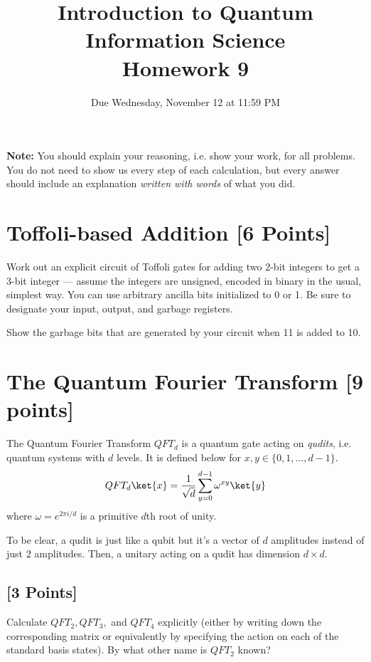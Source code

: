 \documentclass[11pt]{article}
\providecommand{\due}{Due Wednesday, November 12 at 11:59 PM}
\begin{document}
\title{Introduction to Quantum Information Science\\Homework 9}
\date{\due}

\maketitle

\textbf{Note:} You should explain your reasoning, i.e. show your work, for all problems. You do not need to show us every step of each calculation, but every answer should include an explanation \emph{written with words} of what you did.

\section{Toffoli-based Addition [6 Points]}
Work out an explicit circuit of Toffoli gates for adding two 2-bit integers to get a 3-bit integer --- assume the integers are unsigned, encoded in binary in the usual, simplest way. You can use arbitrary ancilla bits initialized to 0 or 1. Be sure to designate your input, output, and garbage registers. 

\noindent Show the garbage bits that are generated by your circuit when 11 is added to 10.



\section{The Quantum Fourier Transform [9 points]}
The Quantum Fourier Transform $QFT_d$ is a quantum gate acting on \textit{qudits}, i.e. quantum systems with $d$ levels. It is defined below for $x,y \in \{0,1,..., d-1\}$.
$$QFT_d\ket{x} = \frac{1}{\sqrt{d}} \sum^{d-1}_{y=0} \omega^{xy} \ket{y} $$
where $\omega = e^{2 \pi i /d}$ is a primitive $d$th root of unity.

To be clear, a qudit is just like a qubit but it's a vector of $d$ amplitudes instead of just $2$ amplitudes. Then, a unitary acting on a qudit has dimension $d\times d$.

\subsection{[3 Points]}
Calculate $QFT_2, QFT_3,$ and $QFT_4$ explicitly (either by writing down the corresponding matrix or equivalently by specifying the action on each of the standard basis states).  By what other name
is $QFT_2$ known?
\end{document}
